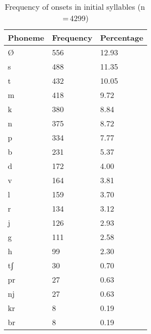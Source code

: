 \begin{table}[pth]\centering
\caption[Frequency of onsets in initial syllables]{Frequency of onsets in initial syllables (n\,=\,4299)}
\begin{tabu} to 0.5\textwidth{X X[c] X[c]}
\tableheaderfont\toprule
Phoneme
	& Frequency
	& Percentage
	\\
	
\toprule

Ø
	& 556
	& 12.93\pct
	\\

\midrule

s
	& 488
	& 11.35\pct
	\\

t
	& 432
	& 10.05\pct
	\\

m
	& 418
	& 9.72\pct
	\\

k
	& 380
	& 8.84\pct
	\\

n
	& 375
	& 8.72\pct
	\\

p
	& 334
	& 7.77\pct
	\\

b
	& 231
	& 5.37\pct
	\\

d
	& 172
	& 4.00\pct
	\\

v
	& 164
	& 3.81\pct
	\\

l
	& 159
	& 3.70\pct
	\\

r
	& 134
	& 3.12\pct
	\\

j
	& 126
	& 2.93\pct
	\\

g
	& 111
	& 2.58\pct
	\\

h
	& 99
	& 2.30\pct
	\\

tʃ
	& 30
	& 0.70\pct
	\\

pr
	& 27
	& 0.63\pct
	\\

nj
	& 27
	& 0.63\pct
	\\

kr
	& 8
	& 0.19\pct
	\\

br
	& 8
	& 0.19\pct
	\\


\end{tabu}
\end{table}
